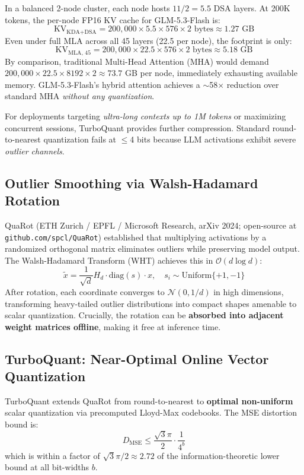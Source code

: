 \documentclass[11pt,a4paper]{article}
\begin{document}
In a balanced 2-node cluster, each node hosts $11 / 2 = 5.5$ DSA layers. At 200K tokens, the per-node FP16 KV cache for GLM-5.3-Flash is:
\begin{equation}
    \text{KV}_{\text{KDA+DSA}} = 200{,}000 \times 5.5 \times 576 \times 2 \text{ bytes} \approx 1.27 \text{ GB}
\end{equation}
Even under full MLA across all 45 layers (22.5 per node), the footprint is only:
\begin{equation}
    \text{KV}_{\text{MLA, 45}} = 200{,}000 \times 22.5 \times 576 \times 2 \text{ bytes} \approx 5.18 \text{ GB}
\end{equation}
By comparison, traditional Multi-Head Attention (MHA) would demand $200{,}000 \times 22.5 \times 8192 \times 2 \approx 73.7$ GB per node, immediately exhausting available memory. GLM-5.3-Flash's hybrid attention achieves a $\sim$58$\times$ reduction over standard MHA \textit{without any quantization}.

For deployments targeting \textit{ultra-long contexts up to 1M tokens} or maximizing concurrent sessions, TurboQuant \cite{turboquant} provides further compression. Standard round-to-nearest quantization fails at $\leq$4 bits because LLM activations exhibit severe \textit{outlier channels}.

\subsection{Outlier Smoothing via Walsh-Hadamard Rotation}
QuaRot \cite{quarot} (ETH Zurich / EPFL / Microsoft Research, arXiv 2024; open-source at \texttt{github.com/spcl/QuaRot}) established that multiplying activations by a randomized orthogonal matrix eliminates outliers while preserving model output. The Walsh-Hadamard Transform (WHT) achieves this in $\mathcal{O}(d \log d)$:
\begin{equation}
    \tilde{x} = \frac{1}{\sqrt{d}} H_d \cdot \text{diag}(s) \cdot x, \quad s_i \sim \text{Uniform}\{+1, -1\}
\end{equation}
After rotation, each coordinate converges to $\mathcal{N}(0, 1/d)$ in high dimensions, transforming heavy-tailed outlier distributions into compact shapes amenable to scalar quantization. Crucially, the rotation can be \textbf{absorbed into adjacent weight matrices offline}, making it free at inference time.

\subsection{TurboQuant: Near-Optimal Online Vector Quantization}
TurboQuant \cite{turboquant} extends QuaRot from round-to-nearest to \textbf{optimal non-uniform} scalar quantization via precomputed Lloyd-Max codebooks. The MSE distortion bound is:
\begin{equation}
    D_{\text{MSE}} \leq \frac{\sqrt{3}\pi}{2} \cdot \frac{1}{4^b}
\end{equation}
which is within a factor of $\sqrt{3}\pi/2 \approx 2.72$ of the information-theoretic lower bound at all bit-widths $b$.
\end{document}
